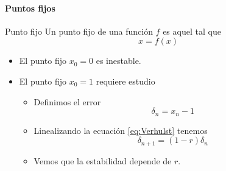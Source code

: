 \documentclass[8pt]{beamer}
\begin{document}
\begin{frame}
\framesubtitle{Puntos fijos}

\begin{block}{Punto fijo}
Un punto fijo de una función $f$ es aquel tal que
\[x=f(x)\]
\end{block}

\begin{itemize}
\item El punto fijo $x_0=0$ es inestable.
\item El punto fijo $x_0=1$ requiere estudio
\begin{itemize}
\item Definimos el error
\[δ_n = x_n-1\]
\item Linealizando la ecuación \eqref{eq:Verhulst} tenemos
\[δ_{n+1} = (1-r)δ_n\]
\item Vemos que la estabilidad depende de $r$.
\end{itemize}
\end{itemize}
\end{frame}
\end{document}
